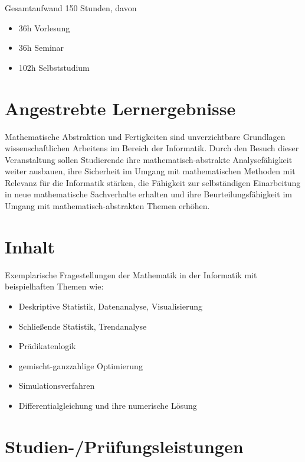 Gesamtaufwand 150 Stunden, davon

\begin{itemize}
\tightlist
\item
  36h Vorlesung
\item
  36h Seminar
\item
  102h Selbststudium
\end{itemize}

\section*{Angestrebte
Lernergebnisse\label{/mi-2017/modulbeschreibungen-master/MA_All_Modul_Mathematik}}\label{angestrebte-lernergebnissepathlabelmi-2017modulbeschreibungen-mastermaux5fallux5fmodulux5fmathematik}

Mathematische Abstraktion und Fertigkeiten sind unverzichtbare
Grundlagen wissenschaftlichen Arbeitens im Bereich der Informatik. Durch
den Besuch dieser Veranstaltung sollen Studierende ihre
mathematisch-abstrakte Analysefähigkeit weiter ausbauen, ihre Sicherheit
im Umgang mit mathematischen Methoden mit Relevanz für die Informatik
stärken, die Fähigkeit zur selbständigen Einarbeitung in neue
mathematische Sachverhalte erhalten und ihre Beurteilungsfähigkeit im
Umgang mit mathematisch-abstrakten Themen erhöhen.

\section*{Inhalt\label{/mi-2017/modulbeschreibungen-master/MA_All_Modul_Mathematik}}\label{inhaltpathlabelmi-2017modulbeschreibungen-mastermaux5fallux5fmodulux5fmathematik}

Exemplarische Fragestellungen der Mathematik in der Informatik mit
beispielhaften Themen wie:

\begin{itemize}
\tightlist
\item
  Deskriptive Statistik, Datenanalyse, Visualisierung
\item
  Schließende Statistik, Trendanalyse
\item
  Prädikatenlogik
\item
  gemischt-ganzzahlige Optimierung
\item
  Simulationsverfahren
\item
  Differentialgleichung und ihre numerische Lösung
\end{itemize}

\section*{Studien-/Prüfungsleistungen\label{/mi-2017/modulbeschreibungen-master/MA_All_Modul_Mathematik}}\label{studien-pruxfcfungsleistungenpathlabelmi-2017modulbeschreibungen-mastermaux5fallux5fmodulux5fmathematik}

